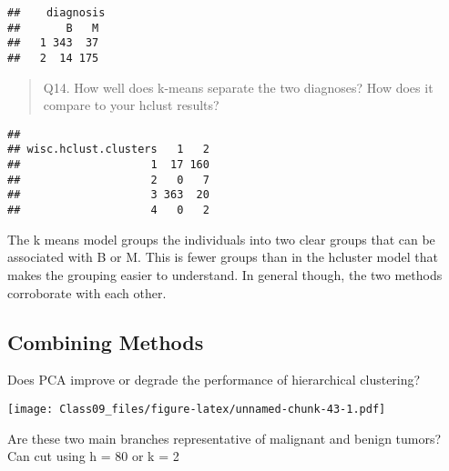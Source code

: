 \documentclass[
]{article}
\newenvironment{Shaded}{\begin{snugshade}}{\end{snugshade}}
\newcommand{\AttributeTok}[1]{\textcolor[rgb]{0.77,0.63,0.00}{#1}}
\newcommand{\DecValTok}[1]{\textcolor[rgb]{0.00,0.00,0.81}{#1}}
\newcommand{\FunctionTok}[1]{\textcolor[rgb]{0.00,0.00,0.00}{#1}}
\newcommand{\NormalTok}[1]{#1}
\newcommand{\OtherTok}[1]{\textcolor[rgb]{0.56,0.35,0.01}{#1}}
\newcommand{\SpecialCharTok}[1]{\textcolor[rgb]{0.00,0.00,0.00}{#1}}
\newcommand{\StringTok}[1]{\textcolor[rgb]{0.31,0.60,0.02}{#1}}
\begin{document}
\begin{verbatim}
##    diagnosis
##       B   M
##   1 343  37
##   2  14 175
\end{verbatim}

\begin{quote}
Q14. How well does k-means separate the two diagnoses? How does it
compare to your hclust results?
\end{quote}

\begin{Shaded}
\end{Shaded}

\begin{verbatim}
##                     
## wisc.hclust.clusters   1   2
##                    1  17 160
##                    2   0   7
##                    3 363  20
##                    4   0   2
\end{verbatim}

The k means model groups the individuals into two clear groups that can
be associated with B or M. This is fewer groups than in the hcluster
model that makes the grouping easier to understand. In general though,
the two methods corroborate with each other.

\hypertarget{combining-methods}{%
\subsection{Combining Methods}\label{combining-methods}}

Does PCA improve or degrade the performance of hierarchical clustering?

\begin{Shaded}
\end{Shaded}

\texttt{[image: Class09\_files/figure-latex/unnamed-chunk-43-1.pdf]}

Are these two main branches representative of malignant and benign
tumors? Can cut using h = 80 or k = 2
\end{document}
